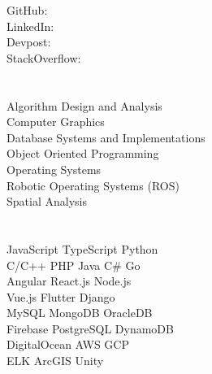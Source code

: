 \documentclass{article}%
\begin{document}
\begin{minipage}{0.38\textwidth}%
GitHub: \href{https://github.com/adriandarian}{} \\%
LinkedIn: \href{https://www.linkedin.com/in/adriandarian}{} \\%
Devpost: \href{https://www.devpost.com/adarian}{} \\%
StackOverflow: \href{https://stackoverflow.com/users/9647369/adarian}{} \\%
\section*{}%
\label{sec:customboldEducation}%
%

%
\section*{}%
\label{sec:customboldCoursework}%
Algorithm Design and Analysis \\%
Computer Graphics \\%
Database Systems and Implementations \\%
Object Oriented Programming \\%
Operating Systems \\%
Robotic Operating Systems (ROS) \\%
Spatial Analysis \\

%
\section*{}%
\label{sec:customboldSkills}%
%
JavaScript \textbullet{} TypeScript \textbullet{} Python \\%
C/C++ \textbullet{} PHP \textbullet{} Java \textbullet{} C\# \textbullet{} Go \\%
%
Angular \textbullet{} React.js \textbullet{} Node.js \\%
Vue.js \textbullet{} Flutter \textbullet{} Django \\%
%
MySQL \textbullet{} MongoDB \textbullet{} OracleDB \\%
Firebase \textbullet{} PostgreSQL \textbullet{} DynamoDB \\%
%
DigitalOcean \textbullet{} AWS \textbullet{} GCP \\%
ELK \textbullet{} ArcGIS \textbullet{} Unity


\end{minipage}
\end{document}
